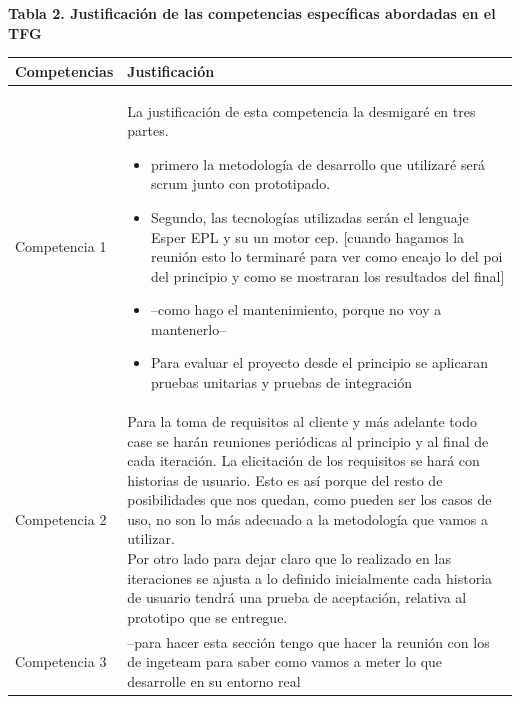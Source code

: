 \documentclass[a4paper]{article}
\begin{document}
\bigskip
{\centering\bfseries
Tabla 2. Justificaci\'on de las competencias espec\'ificas abordadas en el TFG
\par}
\begin{center}
  \begin{supertabular}{m{5.605cm}m{10.849cm}}

	{\color{black} \textbf{Competencias}} &
	{\color{black} \textbf{Justificaci\'on}}\\\hline
    
    {\color{black} Competencia 1} &
    {\color{black} La justificación de esta competencia la desmigaré en tres partes.
    {\begin{itemize} 
    \item primero la metodología de desarrollo que utilizaré será scrum junto con prototipado.
    \item Segundo, las tecnologías utilizadas serán el lenguaje Esper EPL y su un motor cep. [cuando hagamos la reunión esto lo terminaré para ver como encajo lo del poi del principio y como se mostraran los resultados del final]
    \item --como hago el mantenimiento, porque no voy a mantenerlo--
    \item Para evaluar el proyecto desde el principio se aplicaran pruebas unitarias y pruebas de integración
    \end{itemize}}
    }\\
    
    {\color{black} Competencia 2} &
    {\color{black} Para la toma de requisitos al cliente y más adelante todo case se harán reuniones periódicas al principio y al final de cada iteración.
    La elicitación de los requisitos se hará con historias de usuario. Esto es así porque del resto de posibilidades que nos quedan, como pueden ser los casos de uso, no son lo más adecuado a la metodología que vamos a utilizar.\newline
    Por otro lado para dejar claro que lo realizado en las iteraciones se ajusta a lo definido inicialmente cada historia de usuario tendrá una prueba de aceptación, relativa al prototipo que se entregue.}\\
    
    {\color{black} Competencia 3} &
    {\color{black} --para hacer esta sección tengo que hacer la reunión con los de ingeteam para saber como vamos a meter lo que desarrolle en su entorno real}\\
    

\end{supertabular}
\end{center}
\end{document}
